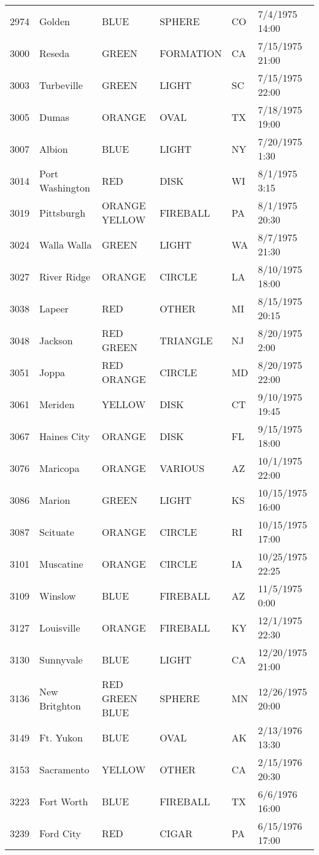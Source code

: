 \begin{tabular}{llllll}
2974 & Golden & BLUE & SPHERE & CO & 7/4/1975 14:00 \\
3000 & Reseda & GREEN & FORMATION & CA & 7/15/1975 21:00 \\
3003 & Turbeville & GREEN & LIGHT & SC & 7/15/1975 22:00 \\
3005 & Dumas & ORANGE & OVAL & TX & 7/18/1975 19:00 \\
3007 & Albion & BLUE & LIGHT & NY & 7/20/1975 1:30 \\
3014 & Port Washington & RED & DISK & WI & 8/1/1975 3:15 \\
3019 & Pittsburgh & ORANGE YELLOW & FIREBALL & PA & 8/1/1975 20:30 \\
3024 & Walla Walla & GREEN & LIGHT & WA & 8/7/1975 21:30 \\
3027 & River Ridge & ORANGE & CIRCLE & LA & 8/10/1975 18:00 \\
3038 & Lapeer & RED & OTHER & MI & 8/15/1975 20:15 \\
3048 & Jackson & RED GREEN & TRIANGLE & NJ & 8/20/1975 2:00 \\
3051 & Joppa & RED ORANGE & CIRCLE & MD & 8/20/1975 22:00 \\
3061 & Meriden & YELLOW & DISK & CT & 9/10/1975 19:45 \\
3067 & Haines City & ORANGE & DISK & FL & 9/15/1975 18:00 \\
3076 & Maricopa & ORANGE & VARIOUS & AZ & 10/1/1975 22:00 \\
3086 & Marion & GREEN & LIGHT & KS & 10/15/1975 16:00 \\
3087 & Scituate & ORANGE & CIRCLE & RI & 10/15/1975 17:00 \\
3101 & Muscatine & ORANGE & CIRCLE & IA & 10/25/1975 22:25 \\
3109 & Winslow & BLUE & FIREBALL & AZ & 11/5/1975 0:00 \\
3127 & Louisville & ORANGE & FIREBALL & KY & 12/1/1975 22:30 \\
3130 & Sunnyvale & BLUE & LIGHT & CA & 12/20/1975 21:00 \\
3136 & New Britghton & RED GREEN BLUE & SPHERE & MN & 12/26/1975 20:00 \\
3149 & Ft. Yukon & BLUE & OVAL & AK & 2/13/1976 13:30 \\
3153 & Sacramento & YELLOW & OTHER & CA & 2/15/1976 20:30 \\
3223 & Fort Worth & BLUE & FIREBALL & TX & 6/6/1976 16:00 \\
3239 & Ford City & RED & CIGAR & PA & 6/15/1976 17:00 \\

\end{tabular}
